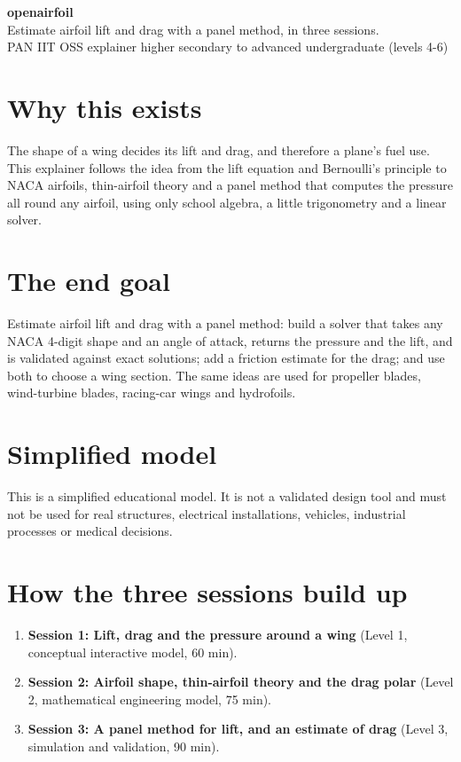 \documentclass[11pt,a4paper]{article}
\begin{document}
\begin{center}{\LARGE\bfseries openairfoil}\\[0.4em]{\large Estimate airfoil lift and drag with a panel method, in three sessions.}\\[0.2em]\small PAN IIT OSS explainer \textbullet{} higher secondary to advanced undergraduate (levels 4-6)\end{center}

\section*{Why this exists}
The shape of a wing decides its lift and drag, and therefore a plane's fuel use. This explainer follows the idea from the lift equation and Bernoulli's principle to NACA airfoils, thin-airfoil theory and a panel method that computes the pressure all round any airfoil, using only school algebra, a little trigonometry and a linear solver.

\section*{The end goal}
Estimate airfoil lift and drag with a panel method: build a solver that takes any NACA 4-digit shape and an angle of attack, returns the pressure and the lift, and is validated against exact solutions; add a friction estimate for the drag; and use both to choose a wing section. The same ideas are used for propeller blades, wind-turbine blades, racing-car wings and hydrofoils.

\section*{Simplified model}
This is a simplified educational model. It is not a validated design tool and must not be used for real structures, electrical installations, vehicles, industrial processes or medical decisions.

\section*{How the three sessions build up}
\begin{enumerate}[nosep]
\item \textbf{Session 1: Lift, drag and the pressure around a wing} (Level 1, conceptual interactive model, 60 min).
\item \textbf{Session 2: Airfoil shape, thin-airfoil theory and the drag polar} (Level 2, mathematical engineering model, 75 min).
\item \textbf{Session 3: A panel method for lift, and an estimate of drag} (Level 3, simulation and validation, 90 min).
\end{enumerate}
\end{document}
